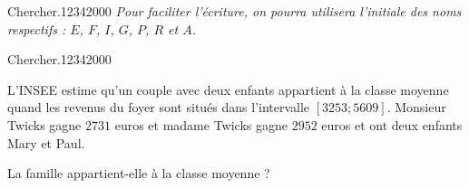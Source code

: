 {\begin{ExoDec}{Chercher.}{1234}{2}{0}{0}{0}
{\small \textit{Pour faciliter l'écriture, on pourra utilisera l'initiale des noms respectifs : $E$, $F$, $I$, $G$, $P$, $R$ et $A$.}}
\end{ExoDec}


\begin{ExoDec}{Chercher.}{1234}{2}{0}{0}{0}
 
L'INSEE estime qu'un couple avec deux enfants appartient à la classe moyenne quand les revenus du foyer sont situés dans l'intervalle $[3253;5609]$. Monsieur Twicks gagne $2731$ euros et madame Twicks gagne $2952$ euros et ont deux enfants Mary et Paul.

 La famille appartient-elle à la classe moyenne ?

%
 
 \end{ExoDec}



}

